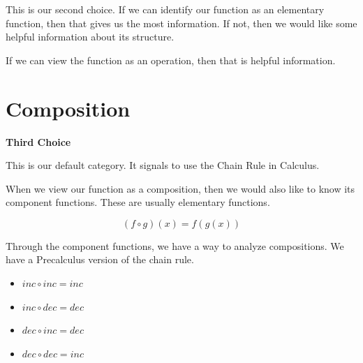 \documentclass{ximera}
\begin{document}
This is our second choice.  If we can identify our function as an elementary function, then that gives us the most information. If not, then we would like some helpful information about its structure. 



If we can view the function as an operation, then that is helpful information.







































\section*{Composition}


\textbf{\textcolor{purple!85!blue}{Third Choice}} 

This is our default category.  It signals to use the Chain Rule in Calculus. 


When we view our function as a composition, then we would also like to know its component functions. These are usually elementary functions. 



\[
(f \circ g)(x) = f(g(x))
\]



Through the component functions, we have a way to analyze compositions.  We have a Precalculus version of the chain rule.


\begin{itemize}
\item  $inc \circ inc = inc$
\item  $inc \circ dec = dec$
\item  $dec \circ inc = dec$
\item  $dec \circ dec = inc$
\end{itemize}
\end{document}
